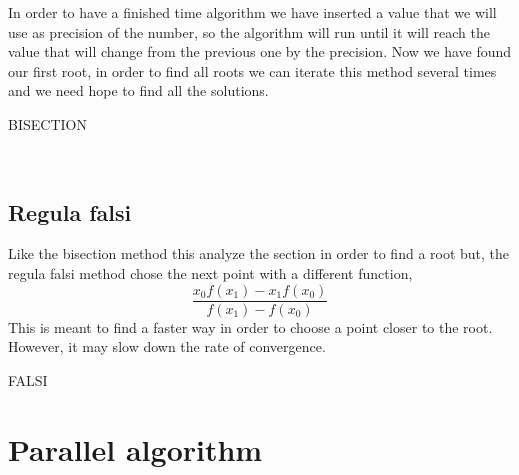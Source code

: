 \documentclass[a4paper,11pt,oneside]{book}
\begin{document}
\noindent In order to have a finished time algorithm we have inserted a value that we will use as precision of the number, so the algorithm will run until it will reach the value that will change from the previous one by the precision. Now we have found our first root, in order to find all roots we can iterate this method several times and we need hope to find all the solutions.

\begin{algorithm}[H]
\caption{BISECTION}
\begin{algorithmic}[1]
\Statex \
		\State {\Return}
	\EndIf
		\Else
		\EndIf
 	\EndWhile
\end{algorithmic}
\end{algorithm}



\subsection*{Regula falsi}

\indent Like the bisection method this analyze the section in order to find a root but, the regula falsi method chose the next point with a different function, $$\frac{x_0f(x_1) - x_1f(x_0)}{f(x_1) - f(x_0)}$$ This is meant to find a faster way in order to choose a point closer to the root. However, it may slow down the rate of convergence.

\begin{algorithm}[H]
\caption{FALSI}
\begin{algorithmic}[1]
\Statex 
		\State {\Return}
	\EndIf
		\Else
		\EndIf
 	\EndWhile
\end{algorithmic}
\end{algorithm}



\section*{Parallel algorithm}
\end{document}
